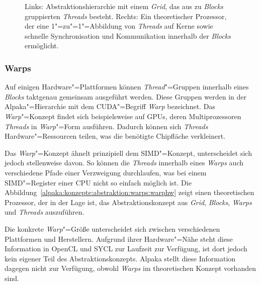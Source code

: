 \begin{figure}
\begin{tikzpicture}
    \end{tikzpicture}
    \caption[Abstraktionshierarchie aus Grid, Blocks und Threads]
            {Links: Abstraktionshierarchie mit einem \textit{Grid}, das aus
             zu \textit{Blocks} gruppierten \textit{Threads} besteht.
             Rechts: Ein theoretischer Prozessor, der eine 1"=zu"=1"=Abbildung
             von \textit{Threads} auf Kerne sowie schnelle Synchronisation und
             Kommunikation innerhalb der \textit{Blocks} ermöglicht.
             \cite[nach][19]{worpitz2015}}
    \label{alpaka:konzepte:abstraktion:blocks:gridblockhw}
\end{figure}

\subsubsection{Warps}

Auf einigen Hardware"=Plattformen können \textit{Thread}"=Gruppen innerhalb
eines \textit{Blocks} taktgenau gemeinsam ausgeführt werden. Diese Gruppen
werden in der Alpaka"=Hierarchie mit dem \mbox{CUDA}"=Begriff \textit{Warp}
bezeichnet. Das \textit{Warp}"=Konzept findet sich beispielsweise auf GPUs,
deren Multiprozessoren \textit{Threads} in \textit{Warp}"=Form ausführen.
Dadurch können sich \textit{Threads} Hardware"=Ressourcen teilen, was die
benötigte Chipfläche verkleinert.

Das \textit{Warp}"=Konzept ähnelt prinzipiell dem SIMD"=Konzept, unterscheidet
sich jedoch stellenweise davon. So können die \textit{Threads} innerhalb eines
\textit{Warps} auch verschiedene Pfade einer Verzweigung durchlaufen, was bei
einem SIMD"=Register einer CPU nicht so einfach möglich ist. Die
Abbildung~\ref{alpaka:konzepte:abstraktion:warps:warphw} zeigt einen
theoretischen Prozessor, der in der Lage ist, das Abstraktionskonzept aus
\textit{Grid}, \textit{Blocks}, \textit{Warps} und \textit{Threads} auszuführen.

Die konkrete \textit{Warp}"=Größe unterscheidet sich zwischen verschiedenen
Plattformen und Herstellern. Aufgrund ihrer Hardware"=Nähe steht diese
Information in OpenCL und SYCL zur Laufzeit zur Verfügung, ist dort jedoch kein
eigener Teil des Abstraktionskonzepts. Alpaka stellt diese Information dagegen
nicht zur Verfügung, obwohl \textit{Warps} im theoretischen Konzept vorhanden
sind.


